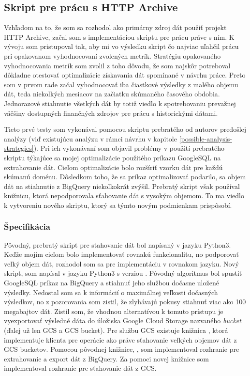 \subsection{Skript pre prácu s HTTP Archive}

Vzhľadom na to, že som sa rozhodol ako primárny zdroj dát použiť projekt HTTP Archive, začal som s implementáciou skriptu pre prácu práve s ním.
K vývoju som pristupoval tak, aby mi vo výsledku skript čo najviac uľahčil prácu pri opakovanom vyhodnocovaní zvolených metrík.
Stratégiu opakovaného vyhodnocovania metrík som zvolil z toho dôvodu, že som najskôr potreboval dôkladne otestovať optimalizácie získavania dát spomínané v návrhu práce.
Preto som v prvom rade začal vyhodnocovať iba čiastkové výsledky z malého objemu dát, teda niekoľkých mesiacov na začiatku skúmaného časového obdobia.
Jednorazové stiahnutie všetkých dát by totiž viedlo k spotrebovaniu prevažnej väčšiny dostupných finančných zdrojov pre prácu s historickými dátami.

Tieto prvé testy som vykonával pomocou skriptu prebratého od autorov predošlej analýzy (viď existujúcu analýzu v rámci návrhu v kapitole \ref{possible-analysis-strategies}).
Pri ich vykonávaní som objavil problémy v použití prebratého skriptu týkajúce sa mojej optimalizácie použitého príkazu GoogleSQL na extrahovanie dát.
Cieľom optimalizácie bolo rozšíriť vzorku dát pre každú skúmanú doménu.
Dôsledkom toho, že sa príkaz optimalizovať podarilo, sa objem dát na stiahnutie z BigQuery niekoľkokrát zvýšil.
Prebratý skript však používal knižnicu, ktorá nepodporovala sťahovanie dát s vysokým objemom.
To ma viedlo k vytvoreniu nového skriptu, ktorý sa týmto novým podmienkam prispôsobí.

\subsubsection{Špecifikácia}

Pôvodný, prebratý skript pre sťahovanie dát bol napísaný v jazyku Python3.
Keďže mojím cieľom bolo implementovať rovnakú funkcionalitu, no podporovať veľký objem dát, rozhodol som sa pre implementáciu v rovnakom jazyku.
Nový skript,  som napísal v jazyku Python3 s verziou .
Pôvodný algoritmus bol spustiť GoogleSQL príkaz na BigQuery a stiahnuť jeho službou dočasne uložené výsledky.
Nedostal som sa k informácií o maximálnej veľkosti dočasných výsledkov, no z pozorovania som zistil, že zlyhávajú pokusy stiahnuť viac ako 100 megabajtov dát.
Zistil som, že vhodnou alternatívou k tomuto prístupu je vyexportovať výsledné dáta do úložiska Google Cloud Storage nazvaného \textit{bucket} (ďalej už len GCS a GCS bucket).
Pre službu GCS existuje knižnica , ktorá implementuje klienta pre operácie ako práve sťahovanie veľkých objemov dát z GCS bucketov.
Pomocou pôvodnej knižnice, , som implementoval rozhranie pre extrahovanie a export dát z BigQuery.
Za pomoci novej knižnice som implementoval rozhranie pre sťahovanie dát z GCS.

